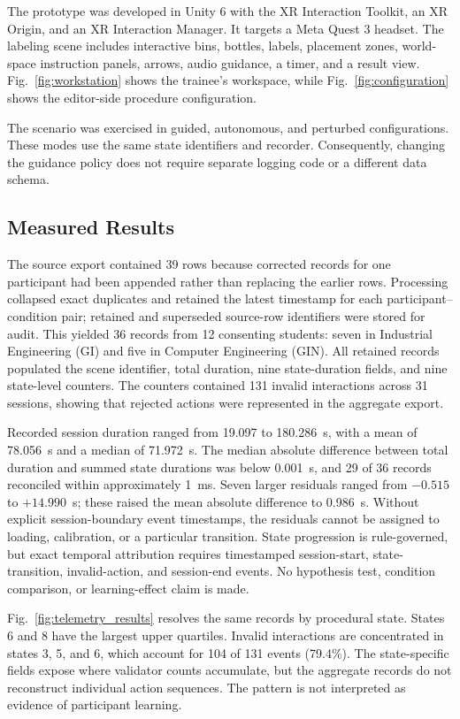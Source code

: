 \documentclass[conference]{IEEEtran}
\begin{document}
The prototype was developed in Unity 6 with the XR Interaction Toolkit, an XR Origin, and an XR Interaction Manager. It targets a Meta Quest 3 headset. The labeling scene includes interactive bins, bottles, labels, placement zones, world-space instruction panels, arrows, audio guidance, a timer, and a result view. Fig.~\ref{fig:workstation} shows the trainee's workspace, while Fig.~\ref{fig:configuration} shows the editor-side procedure configuration.

The scenario was exercised in guided, autonomous, and perturbed configurations. These modes use the same state identifiers and recorder. Consequently, changing the guidance policy does not require separate logging code or a different data schema.

\subsection{Measured Results}

The source export contained 39 rows because corrected records for one participant had been appended rather than replacing the earlier rows. Processing collapsed exact duplicates and retained the latest timestamp for each participant--condition pair; retained and superseded source-row identifiers were stored for audit. This yielded 36 records from 12 consenting students: seven in Industrial Engineering (GI) and five in Computer Engineering (GIN). All retained records populated the scene identifier, total duration, nine state-duration fields, and nine state-level counters. The counters contained 131 invalid interactions across 31 sessions, showing that rejected actions were represented in the aggregate export.

Recorded session duration ranged from 19.097 to 180.286~s, with a mean of 78.056~s and a median of 71.972~s. The median absolute difference between total duration and summed state durations was below 0.001~s, and 29 of 36 records reconciled within approximately 1~ms. Seven larger residuals ranged from $-0.515$ to $+14.990$~s; these raised the mean absolute difference to 0.986~s. Without explicit session-boundary event timestamps, the residuals cannot be assigned to loading, calibration, or a particular transition. State progression is rule-governed, but exact temporal attribution requires timestamped session-start, state-transition, invalid-action, and session-end events. No hypothesis test, condition comparison, or learning-effect claim is made.

Fig.~\ref{fig:telemetry_results} resolves the same records by procedural state. States 6 and 8 have the largest upper quartiles. Invalid interactions are concentrated in states 3, 5, and 6, which account for 104 of 131 events (79.4\%). The state-specific fields expose where validator counts accumulate, but the aggregate records do not reconstruct individual action sequences. The pattern is not interpreted as evidence of participant learning.
\end{document}
